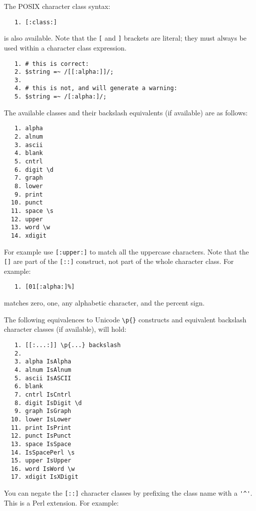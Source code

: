 The POSIX character class syntax:

\begin{verbatim}
   1. [:class:]
\end{verbatim}

is also available. Note that the \verb|[| and \verb|]| brackets are literal; 
they must always be used within a character class expression.

\begin{verbatim}
   1. # this is correct:
   2. $string =~ /[[:alpha:]]/;
   3.
   4. # this is not, and will generate a warning:
   5. $string =~ /[:alpha:]/;
\end{verbatim}


The available classes and their backslash equivalents (if available) are as follows:

\begin{verbatim}
   1. alpha
   2. alnum
   3. ascii
   4. blank
   5. cntrl
   6. digit \d
   7. graph
   8. lower
   9. print
  10. punct
  11. space \s 
  12. upper
  13. word \w 
  14. xdigit
\end{verbatim}


For example use \verb|[:upper:]| to match all the uppercase characters. 
Note that the \verb|[]| are part of the \verb|[::]|
construct, not part of the whole character class. For example:

\begin{verbatim}
   1. [01[:alpha:]%]
\end{verbatim}

matches zero, one, any alphabetic character, and the percent sign.


The following equivalences to Unicode 
\verb|\p{}| constructs and equivalent backslash 
character classes (if available), will hold:

\begin{verbatim}
   1. [[:...:]] \p{...} backslash
   2.
   3. alpha IsAlpha
   4. alnum IsAlnum
   5. ascii IsASCII
   6. blank
   7. cntrl IsCntrl
   8. digit IsDigit \d
   9. graph IsGraph
  10. lower IsLower
  11. print IsPrint 
  12. punct IsPunct 
  13. space IsSpace
  14. IsSpacePerl \s
  15. upper IsUpper
  16. word IsWord \w
  17. xdigit IsXDigit
\end{verbatim}


You can negate the \verb|[::]| character classes by prefixing 
the class name with a \verb|'^'|. This is a Perl extension. For example:

